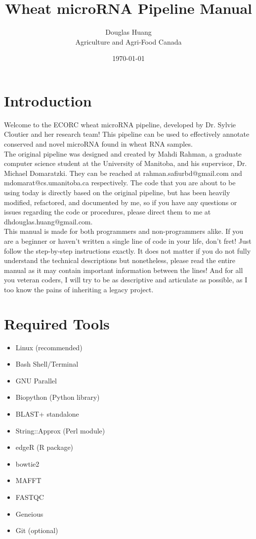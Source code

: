 \documentclass[12pt,titlepage]{article}
\title{Wheat microRNA Pipeline Manual}
\author{Douglas Huang\\Agriculture and Agri-Food Canada}
\date{\today}
\begin{document}
\maketitle
\section*{Introduction}
Welcome to the ECORC wheat microRNA pipeline, developed by Dr. Sylvie Cloutier and her research team! This pipeline can be used to effectively annotate conserved and novel microRNA found in wheat RNA samples.\\

The original pipeline was designed and created by Mahdi Rahman, a graduate computer science student at the University of Manitoba, and his supervisor, Dr. Michael Domaratzki. They can be reached at rahman.safiurbd@gmail.com and mdomarat@cs.umanitoba.ca respectively. The code that you are about to be using today is directly based on the original pipeline, but has been heavily modified, refactored, and documented by me, so if you have any questions or issues regarding the code or procedures, please direct them to me at dhdouglas.huang@gmail.com.\\

This manual is made for both programmers and non-programmers alike. If you are a beginner or haven't written a single line of code in your life, don't fret! Just follow the step-by-step instructions exactly. It does not matter if you do not fully understand the technical descriptions but nonetheless, please read the entire manual as it may contain important information between the lines! And for all you veteran coders, I will try to be as descriptive and articulate as possible, as I too know the pains of inheriting a legacy project.									
\section*{Required Tools}
\begin{multicols}{2}
\begin{itemize}
\item Linux (recommended)
\item Bash Shell/Terminal
\item GNU Parallel
\item Biopython (Python library)
\item BLAST+ standalone
\item String::Approx (Perl module)
\item edgeR (R package)
\item bowtie2
\item MAFFT
\item FASTQC
\item Geneious
\item Git (optional)
\end{itemize}
\end{multicols}
\end{document}
